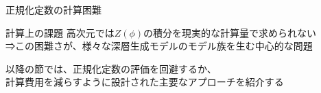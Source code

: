 \begin{frame}{正規化定数の計算困難}
    \begin{alertblock}{計算上の課題}
        高次元では$Z(\phi)$の積分を現実的な計算量で求められない\\
        ⇒この困難さが、様々な深層生成モデルのモデル族を生む中心的な問題
    \end{alertblock}
    以降の節では、正規化定数の評価を回避するか、\\
    計算費用を減らすように設計された主要なアプローチを紹介する
\end{frame}

